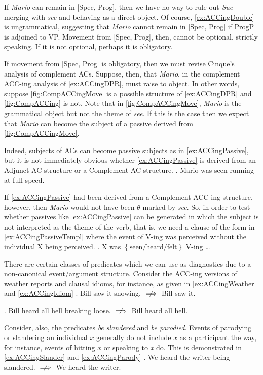 \documentclass[MilwayThesis]{subfiles}
\begin{document}
If \textit{Mario} can remain in [Spec, Prog], then we have no way to rule out \textit{Sue} merging with \textit{see} and behaving as a direct object.
Of course, \cref{ex:ACCingDouble} is ungrammatical, suggesting that \textit{Mario} cannot remain in [Spec, Prog] if ProgP is adjoined to VP.
Movement from [Spec, Prog], then, cannot be optional, strictly speaking.
If it is not optional, perhaps it is obligatory.

If movement from [Spec, Prog] is obligatory, then we must revise Cinque's analysis of complement ACs.
Suppose, then, that \textit{Mario}, in the complement ACC-ing analysis of \cref{ex:ACCingDPR}, must raise to object.
In other words, suppose \cref{fig:CompACCingMove} is a possible structure of \cref{ex:ACCingDPR} and \cref{fig:CompACCing} is not.
Note that in \cref{fig:CompACCingMove}, \textit{Mario} is the grammatical object but not the theme of \textit{see}.
If this is the case then we expect that \textit{Mario} can become the subject of a passive derived from \cref{fig:CompACCingMove}.

Indeed, subjects of ACs can become passive subjects as in \cref{ex:ACCingPassive}, but it is not immediately obvious whether \cref{ex:ACCingPassive} is derived from an Adjunct AC structure or a Complement AC structure.
\ex. Mario was seen running at full speed. \label{ex:ACCingPassive}

If \cref{ex:ACCingPassive} had been derived from a Complement ACC-ing structure, however, then \textit{Mario} would not have been $\theta$-marked by \textit{see}.
So, in order to test whether passives like \cref{ex:ACCingPassive} can be generated in which the subject is not interpreted as the theme of the verb, that is, we need a clause of the form in \cref{ex:ACCingPassiveTempl} where the event of V-ing was perceived without the individual X being perceived.
\ex. X was $\left\{ \text{seen/heard/felt} \right\}$ V-ing \ldots\label{ex:ACCingPassiveTempl}

There are certain classes of predicates which we can use as diagnostics due to a non-canonical event/argument structure.
Consider the ACC-ing versions of weather reports and clausal idioms, for instance, as given in \cref{ex:ACCingWeather} and \cref{ex:ACCingIdiom}
\ex. Bill saw it snowing. $\centernot\implies$ Bill saw it. \label{ex:ACCingWeather}

\ex. Bill heard all hell breaking loose. $\centernot\implies$ Bill heard all hell. \label{ex:ACCingIdiom}

Consider, also, the predicates \textit{be slandered} and \textit{be parodied}.
Events of parodying or slandering an individual $x$ generally do not include $x$ as a participant the way, for instance, events of hitting $x$ or speaking to \textit{x} do.
This is demonstrated in \cref{ex:ACCingSlander} and \cref{ex:ACCingParody}
\ex. We heard the writer being slandered. $\centernot\implies$ We heard the writer. \label{ex:ACCingSlander}
\end{document}
